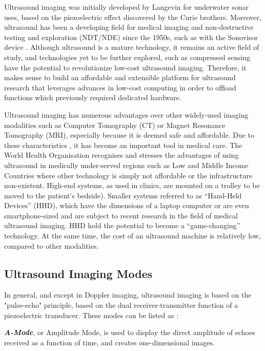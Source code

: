 \documentclass{article}
\begin{document}
Ultrasound imaging was initially developed by Langevin for underwater sonar uses, based on the piezoelectric effect discovered by the Curie brothers. Moreover, ultrasound has been a developing field for medical imaging and non-destructive testing and exploration (NDT/NDE) since the 1950s, such as with the Sonovisor device \cite{zeiss_sonovisor_1962}. Although ultrasound is a mature technology, it remains an active field of study, and  technologies yet to be further explored, such as compressed sensing \cite{kruizinga_compressive_2017,liebgott_compressive_2012} have the potential to revolutionize low-cost ultrasound imaging.
Therefore, it makes sense to build an affordable and extensible platform for ultrasound research that leverages advances in low-cost computing in order to offload functions which previously required dedicated hardware.

Ultrasound imaging has numerous advantages over other widely-used imaging modalities such as Computer Tomography (CT) or Magnet Resonance Tomography (MRI), especially because it is deemed safe and affordable. Due to these characteristics \cite{kurjak_use_1986}, it has become an important tool in medical care. The World Health Organisation \cite{who_future_1985} recognises and stresses the advantages of using ultrasound in medically under-served regions such as Low and Middle Income Countries where other technology is simply not affordable or the infrastructure non-existent. High-end systems, as used in clinics, are mounted on a trolley to be moved to the patient’s bedside). Smaller systems referred to as “Hand-Held Devices” (HHD), which have the dimensions of a laptop computer or are even smartphone-sized and are subject to recent research in the field of medical ultrasound imaging. HHD hold the potential to become a “game-changing” technology\cite{kjeken_systematic_2011}. At the same time, the cost of an ultrasound machine is relatively low, compared to other modalities.

\subsection{Ultrasound Imaging Modes}

In general, and except in Doppler imaging, ultrasound imaging is based on the "pulse-echo" principle, based on the dual receiver-transmitter function of a piezoelectric transducer. These modes can be listed as :

\textbf{\textit{A-Mode}}, or Amplitude Mode, is used to display the direct amplitude of echoes received as a function of time, and creates one-dimensional images.
\end{document}
